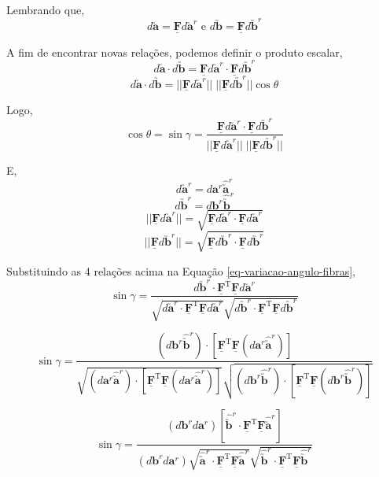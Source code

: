 	Lembrando que,
	\[d\utilde{\mathbf{a}}=\underline{\mathbf{F}}d\utilde{\mathbf{a}}^r\text{ e }d\utilde{\mathbf{b}}=\underline{\mathbf{F}}d\utilde{\mathbf{b}}^r\]
	
	A fim de encontrar novas relações, podemos definir o produto escalar,
	\[d\utilde{\mathbf{a}}\cdot d\utilde{\mathbf{b}}=\underline{\mathbf{F}}d\utilde{\mathbf{a}}^r\cdot\underline{\mathbf{F}}d\utilde{\mathbf{b}}^r\]
	\[d\utilde{\mathbf{a}}\cdot d\utilde{\mathbf{b}}=||\underline{\mathbf{F}}d\utilde{\mathbf{a}}^r||\;|| \underline{\mathbf{F}}d\utilde{\mathbf{b}}^r ||\cos\theta\]
	
	Logo,
	\begin{equation}\label{eq-variacao-angulo-fibras}
		\cos\theta=\sin\gamma=\frac{\underline{\mathbf{F}}d\utilde{\mathbf{a}}^r\cdot\underline{\mathbf{F}}d\utilde{\mathbf{b}}^r}{||\underline{\mathbf{F}}d\utilde{\mathbf{a}}^r||\;|| \underline{\mathbf{F}}d\utilde{\mathbf{b}}^r ||}
	\end{equation}
	
	E,
	\[d\utilde{\mathbf{a}}^r=d\mathbf{a}^r\hat{\utilde{\mathbf{a}}}^r\]
	\[d\utilde{\mathbf{b}}^r=d\mathbf{b}^r\hat{\utilde{\mathbf{b}}}^r\]
	\[||\underline{\mathbf{F}}d\utilde{\mathbf{a}}^r||=\sqrt{\underline{\mathbf{F}}d\utilde{\mathbf{a}}^r\cdot\underline{\mathbf{F}}d\utilde{\mathbf{a}}^r}\]
	\[||\underline{\mathbf{F}}d\utilde{\mathbf{b}}^r||=\sqrt{\underline{\mathbf{F}}d\utilde{\mathbf{b}}^r\cdot\underline{\mathbf{F}}d\utilde{\mathbf{b}}^r}\]
	
	Substituindo as 4 relações acima na Equação \eqref{eq-variacao-angulo-fibras},
	\[\sin\gamma=\frac{d\utilde{\mathbf{b}}^r\cdot\underline{\mathbf{F}}^{\text{T}}\underline{\mathbf{F}}d\utilde{\mathbf{a}}^r}{\sqrt{d\utilde{\mathbf{a}}^r\cdot\underline{\mathbf{F}}^{\text{T}}\underline{\mathbf{F}}d\utilde{\mathbf{a}}^r}\sqrt{d\utilde{\mathbf{b}}^r\cdot\underline{\mathbf{F}}^{\text{T}}\underline{\mathbf{F}}d\utilde{\mathbf{b}}^r}}\]
	
	\[\sin\gamma=\frac{(d\mathbf{b}^r\hat{\utilde{\mathbf{b}}}^r)\cdot[\underline{\mathbf{F}}^{\text{T}}\underline{\mathbf{F}}(d\mathbf{a}^r\hat{\utilde{\mathbf{a}}}^r)]}{\sqrt{(d\mathbf{a}^r\hat{\utilde{\mathbf{a}}}^r)\cdot[\underline{\mathbf{F}}^{\text{T}}\underline{\mathbf{F}}(d\mathbf{a}^r\hat{\utilde{\mathbf{a}}}^r)]}\sqrt{(d\mathbf{b}^r\hat{\utilde{\mathbf{b}}}^r)\cdot[\underline{\mathbf{F}}^{\text{T}}\underline{\mathbf{F}}(d\mathbf{b}^r\hat{\utilde{\mathbf{b}}}^r)]}}\]
	
	\[\sin\gamma=\frac{(d\mathbf{b}^rd\mathbf{a}^r)[\hat{\utilde{\mathbf{b}}}^r\cdot\underline{\mathbf{F}}^{\text{T}}\underline{\mathbf{F}}\hat{\utilde{\mathbf{a}}}^r]}{(d\mathbf{b}^rd\mathbf{a}^r)\sqrt{\hat{\utilde{\mathbf{a}}}^r\cdot\underline{\mathbf{F}}^{\text{T}}\underline{\mathbf{F}}\hat{\utilde{\mathbf{a}}}^r}\sqrt{\hat{\utilde{\mathbf{b}}}^r\cdot\underline{\mathbf{F}}^{\text{T}}\underline{\mathbf{F}}\hat{\utilde{\mathbf{b}}}^r}}\]
	
